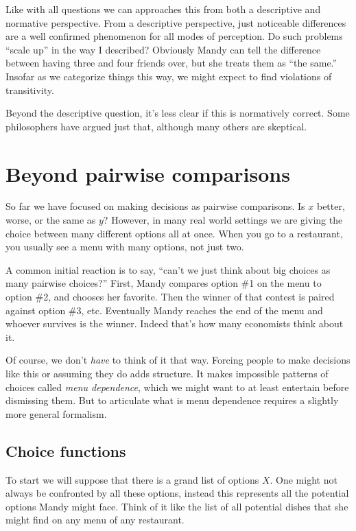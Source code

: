 Like with all questions we can approaches this from both a descriptive and normative perspective.  From a descriptive perspective, just noticeable differences are a well confirmed phenomenon for all modes of perception. Do such problems ``scale up'' in the way I described?  Obviously Mandy can tell the difference between having three and four friends over, but she treats them as ``the same.''  Insofar as we categorize things this way, we might expect to find violations of transitivity.  

 Beyond the descriptive question, it's less clear if this is normatively correct.  Some philosophers have argued just that, although many others are skeptical.

\section{Beyond pairwise comparisons}
\label{s:choice-functions}

So far we have focused on making decisions as pairwise comparisons.  Is $x$ better, worse, or the same as $y$?  However, in many real world settings we are giving the choice between many different options all at once.  When you go to a restaurant, you usually see a menu with many options, not just two.

A common initial reaction is to say, ``can't we just think about big choices as many pairwise choices?'' First, Mandy compares option \#1 on the menu to option \#2, and chooses her favorite.  Then the winner of that contest is paired against option \#3, etc.  Eventually Mandy reaches the end of the menu and whoever survives is the winner. Indeed that's how many economists think about it.  

Of course, we don't {\it have} to think of it that way.  Forcing people to make decisions like this or assuming they do adds structure. It makes impossible patterns of choices called {\it menu dependence}, which we might want to at least entertain before dismissing them.  But to articulate what is menu dependence requires a slightly more general formalism.

\subsection{Choice functions}

To start we will suppose that there is a grand list of options $X$.  One might not always be confronted by all these options, instead this represents all the potential options Mandy might face.  Think of it like the list of all potential dishes that she might find on any menu of any restaurant.

